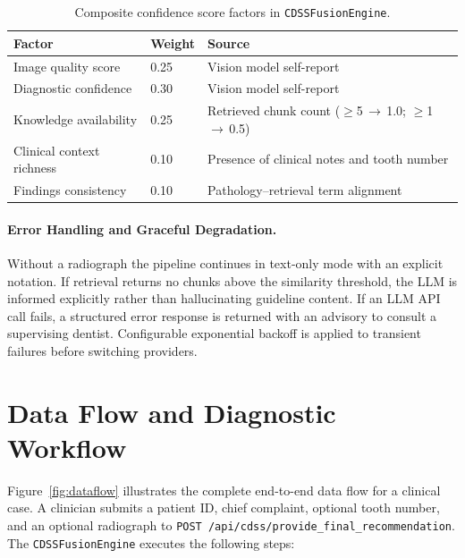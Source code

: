 \documentclass[12pt,a4paper]{report}
\begin{document}
	
	\begin{table}[H]
		\centering
		\caption{Composite confidence score factors in \texttt{CDSSFusionEngine}.}
		\label{tab:confidence}
		\begin{tabular}{lll}
			\toprule
			\textbf{Factor} & \textbf{Weight} & \textbf{Source} \\
			\midrule
			Image quality score       & 0.25 & Vision model self-report \\
			Diagnostic confidence     & 0.30 & Vision model self-report \\
			Knowledge availability    & 0.25 & Retrieved chunk count ($\geq$5\,$\rightarrow$\,1.0; $\geq$1\,$\rightarrow$\,0.5) \\
			Clinical context richness & 0.10 & Presence of clinical notes and tooth number \\
			Findings consistency      & 0.10 & Pathology--retrieval term alignment \\
			\bottomrule
		\end{tabular}
	\end{table}
	
	
	\paragraph{Error Handling and Graceful Degradation.}
	Without a radiograph the pipeline continues in text-only mode with an explicit notation.
	If retrieval returns no chunks above the similarity threshold, the LLM is informed
	explicitly rather than hallucinating guideline content. If an LLM API call fails, a
	structured error response is returned with an advisory to consult a supervising dentist.
	Configurable exponential backoff is applied to transient failures before switching
	providers.
	
	\section{Data Flow and Diagnostic Workflow}
	\label{sec:workflow}
	
	Figure~\ref{fig:dataflow} illustrates the complete end-to-end data flow for a clinical
	case. A clinician submits a patient ID, chief complaint, optional tooth number, and an
	optional radiograph to \texttt{POST /api/cdss/provide\_final\_recommendation}.
	The \texttt{CDSSFusionEngine} executes the following steps:
	
\end{document}
